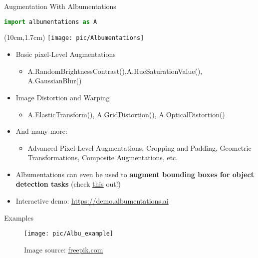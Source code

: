 \documentclass[serif, aspectratio=169]{beamer}
\begin{document}
\begin{frame}[fragile]{Augmentation With Albumentations}

\begin{minipage}{0.43\textwidth}
\begin{lstlisting}[language=python]
import albumentations as A
\end{lstlisting}
\end{minipage}

	
	\begin{textblock*}{5cm}(10cm,1.7cm) %
		\texttt{[image: pic/Albumentations]}
	\end{textblock*}
	
	\vspace{0.5cm}
	\begin{itemize}
		\item Basic pixel-Level Augmentations
		\begin{itemize}
			\item 
			{\sffamily A.RandomBrightnessContrast(),A.HueSaturationValue(), 
				A.GaussianBlur()}
		\end{itemize}
		
		\item Image Distortion and Warping
		\begin{itemize}
			\item {\sffamily A.ElasticTransform(), A.GridDistortion(), A.OpticalDistortion()}
		\end{itemize}
		\item And many more:
		\begin{itemize}
			\item Advanced Pixel-Level Augmentations, Cropping and Padding, Geometric Transformations, Composite Augmentations, etc.
		\end{itemize}
		\item Albumentations can even be used to \textbf{augment bounding boxes for object detection tasks} (check \href{https://albumentations.ai/docs/examples/example_bboxes/}{\color{blue}this} out!)
		\item Interactive demo: \href{https://demo.albumentations.ai}{\color{blue} https://demo.albumentations.ai}

	\end{itemize}
\end{frame}

\begin{frame}{Examples}	

	\begin{figure}
		\begin{center}
			\texttt{[image: pic/Albu\_example]}
			\caption*{Image source: \href{http://freepik.com}{\color{blue}freepik.com}}
		\end{center}
	\end{figure}
\end{frame}
\end{document}
